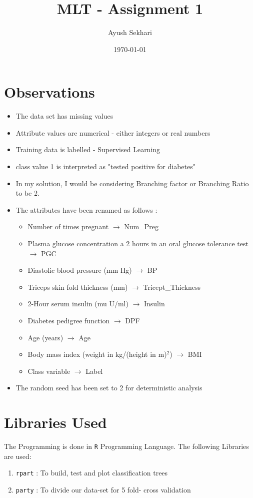 \documentclass[12pt]{article}%
\begin{document}
\title{MLT - Assignment 1}
\author{Ayush Sekhari}
\date{\today}
\maketitle

\section{Observations}
\begin{itemize}
\item The data set has missing values
\item Attribute values are numerical - either integers or real numbers
\item Training data is labelled - Supervised Learning 
\item class value 1 is interpreted as "tested positive for diabetes"
\item In my solution, I would be considering Branching factor or Branching Ratio to be 2.
\item The attributes have been renamed as follows : 
\begin{itemize}
\item Number of times pregnant $\rightarrow$ Num\_Preg
\item Plasma glucose concentration a 2 hours in an oral glucose tolerance test $\rightarrow$ PGC
\item Diastolic blood pressure (mm Hg) $\rightarrow$ BP
\item Triceps skin fold thickness (mm) $\rightarrow$ Tricept\_Thickness
\item 2-Hour serum insulin (mu U/ml) $\rightarrow$ Insulin
\item Diabetes pedigree function $\rightarrow$ DPF
\item Age (years) $\rightarrow$ Age
\item Body mass index (weight in kg/(height in m)$^2$) $\rightarrow$ BMI
\item Class variable $\rightarrow$ Label
\end{itemize} 
\item The random seed has been set to 2 for deterministic analysis
\end{itemize}

\section{Libraries Used}
The Programming is done in {\tt R} Programming Language. The following Libraries are used: 
\begin{enumerate}
\item {\tt rpart} : To build, test and plot classification trees
\item {\tt party} : To divide our data-set for 5 fold- cross validation 

\end{enumerate}
\end{document}

